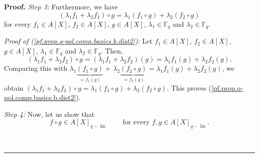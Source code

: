 \documentclass[numbers=enddot,12pt,final,onecolumn,notitlepage]{scrartcl}%
\theoremstyle{definition}
\newenvironment{proof}[1][Proof]{\noindent\textbf{#1.} }{\ \rule{0.5em}{0.5em}}
\begin{document}
\begin{proof}
\textit{Step 3:} Furthermore, we have%
\begin{equation}
\left(  \lambda_{1}f_{1}+\lambda_{2}f_{2}\right)  \circ g=\lambda_{1}\left(
f_{1}\circ g\right)  +\lambda_{2}\left(  f_{2}\circ g\right)
\label{pf.prop.q-pol.comp.basics.b.dist2}%
\end{equation}
for every $f_{1}\in A\left[  X\right]  $, $f_{2}\in A\left[  X\right]  $,
$g\in A\left[  X\right]  $, $\lambda_{1}\in\mathbb{F}_{q}$ and $\lambda_{2}%
\in\mathbb{F}_{q}$.

\textit{Proof of (\ref{pf.prop.q-pol.comp.basics.b.dist2}):} Let $f_{1}\in
A\left[  X\right]  $, $f_{2}\in A\left[  X\right]  $, $g\in A\left[  X\right]
$, $\lambda_{1}\in\mathbb{F}_{q}$ and $\lambda_{2}\in\mathbb{F}_{q}$. Then,%
\[
\left(  \lambda_{1}f_{1}+\lambda_{2}f_{2}\right)  \circ g=\left(  \lambda
_{1}f_{1}+\lambda_{2}f_{2}\right)  \left(  g\right)  =\lambda_{1}f_{1}\left(
g\right)  +\lambda_{2}f_{2}\left(  g\right)  .
\]
Comparing this with $\lambda_{1}\underbrace{\left(  f_{1}\circ g\right)
}_{=f_{1}\left(  g\right)  }+\,\lambda_{2}\underbrace{\left(  f_{2}\circ
g\right)  }_{=f_{2}\left(  g\right)  }=\lambda_{1}f_{1}\left(  g\right)
+\lambda_{2}f_{2}\left(  g\right)  $, we obtain $\left(  \lambda_{1}%
f_{1}+\lambda_{2}f_{2}\right)  \circ g=\lambda_{1}\left(  f_{1}\circ g\right)
+\lambda_{2}\left(  f_{2}\circ g\right)  $. This proves
(\ref{pf.prop.q-pol.comp.basics.b.dist2}).

\textit{Step 4:} Now, let us show that%
\begin{equation}
f\circ g\in A\left[  X\right]  _{q-\operatorname*{lin}}%
\ \ \ \ \ \ \ \ \ \ \text{for every }f,g\in A\left[  X\right]
_{q-\operatorname*{lin}}. \label{pf.prop.q-pol.comp.basics.b.closed}%
\end{equation}



\end{proof}
\end{document}
